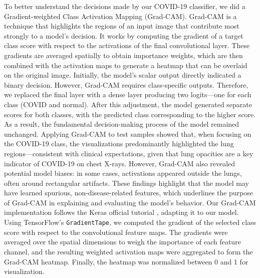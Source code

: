 \documentclass[conference]{IEEEtran}
\begin{document}
To better understand the decisions made by our COVID-19 classifier, we did a Gradient-weighted Class Activation Mapping (Grad-CAM). Grad-CAM is a technique that highlights the regions of an input image that contribute most strongly to a model’s decision. It works by computing the gradient of a target class score with respect to the activations of the final convolutional layer. These gradients are averaged spatially to obtain importance weights, which are then combined with the activation maps to generate a heatmap that can be overlaid on the original image.
Initially, the model's scalar output directly indicated a binary decision. However, Grad-CAM requires class-specific outputs. Therefore, we replaced the final layer with a dense layer producing two logits—one for each class (COVID and normal). After this adjustment, the model generated separate scores for both classes, with the predicted class corresponding to the higher score. As a result, the fundamental decision-making process of the model remained unchanged.
Applying Grad-CAM to test samples showed that, when focusing on the COVID-19 class, the visualizations predominantly highlighted the lung regions—consistent with clinical expectations, given that lung opacities are a key indicator of COVID-19 on chest X-rays. However, Grad-CAM also revealed potential model biases: in some cases, activations appeared outside the lungs, often around rectangular artifacts. These findings highlight that the model may have learned spurious, non-disease-related features, which underlines the purpose of Grad-CAM in explaining and evaluating the model's behavior.
Our Grad-CAM implementation follows the Keras official tutorial \cite{keras_gradcam}, adapting it to our model. Using TensorFlow’s \texttt{GradientTape}, we computed the gradient of the selected class score with respect to the convolutional feature maps. The gradients were averaged over the spatial dimensions to weigh the importance of each feature channel, and the resulting weighted activation maps were aggregated to form the Grad-CAM heatmap. Finally, the heatmap was normalized between 0 and 1 for visualization.
\end{document}

